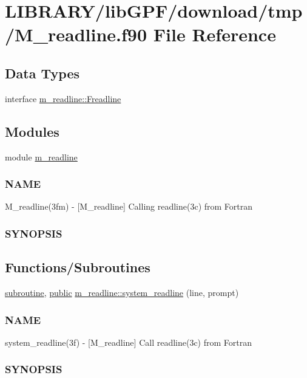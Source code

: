 \hypertarget{M__readline_8f90}{}\section{L\+I\+B\+R\+A\+R\+Y/lib\+G\+P\+F/download/tmp/\+M\+\_\+readline.f90 File Reference}
\label{M__readline_8f90}
\subsection*{Data Types}
\begin{DoxyCompactItemize}
\item 
interface \hyperlink{interfacem__readline_1_1Freadline}{m\+\_\+readline\+::\+Freadline}
\end{DoxyCompactItemize}
\subsection*{Modules}
\begin{DoxyCompactItemize}
\item 
module \hyperlink{namespacem__readline}{m\+\_\+readline}
\begin{DoxyCompactList}\small\item\em \subsubsection*{N\+A\+ME}

M\+\_\+readline(3fm) -\/ \mbox{[}M\+\_\+readline\mbox{]} Calling readline(3c) from Fortran \subsubsection*{S\+Y\+N\+O\+P\+S\+IS}\end{DoxyCompactList}\end{DoxyCompactItemize}
\subsection*{Functions/\+Subroutines}
\begin{DoxyCompactItemize}
\item 
\hyperlink{M__stopwatch_83_8txt_acfbcff50169d691ff02d4a123ed70482}{subroutine}, \hyperlink{M__stopwatch_83_8txt_a2f74811300c361e53b430611a7d1769f}{public} \hyperlink{namespacem__readline_a6eae368d34bd43ead64623b2d6d10ae0}{m\+\_\+readline\+::system\+\_\+readline} (line, prompt)
\begin{DoxyCompactList}\small\item\em \subsubsection*{N\+A\+ME}

system\+\_\+readline(3f) -\/ \mbox{[}M\+\_\+readline\mbox{]} Call readline(3c) from Fortran \subsubsection*{S\+Y\+N\+O\+P\+S\+IS}\end{DoxyCompactList}\end{DoxyCompactItemize}
